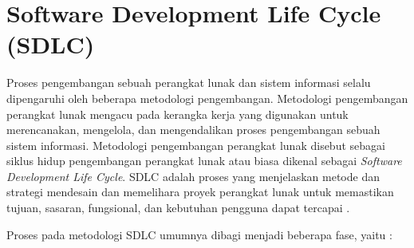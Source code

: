 \section{Software Development Life Cycle (SDLC)}
Proses pengembangan sebuah perangkat lunak dan sistem informasi selalu dipengaruhi oleh beberapa metodologi pengembangan. Metodologi pengembangan perangkat lunak mengacu pada kerangka kerja yang digunakan untuk merencanakan, mengelola, dan mengendalikan proses pengembangan sebuah sistem informasi. Metodologi pengembangan perangkat lunak disebut sebagai siklus hidup pengembangan perangkat lunak atau biasa dikenal sebagai \textit{Software Development Life Cycle}. SDLC adalah proses yang menjelaskan metode dan strategi mendesain dan memelihara proyek perangkat lunak untuk memastikan tujuan, sasaran, fungsional, dan kebutuhan pengguna dapat tercapai \citep{Arora2016}.

Proses pada metodologi SDLC umumnya dibagi menjadi beberapa fase, yaitu \citep{Dora2013}:

